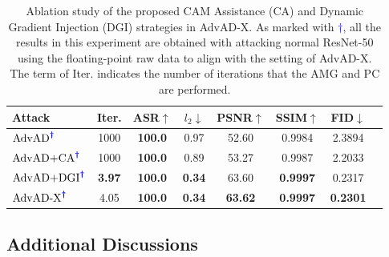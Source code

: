 \documentclass{article}
\begin{document}
\begin{table}[h]
    \caption{Ablation study of the proposed CAM Assistance (CA) and Dynamic Gradient Injection (DGI) strategies in AdvAD-X. As marked with \textcolor{blue}{$\boldsymbol{\dag}$}, all the results in this experiment are obtained with attacking normal ResNet-50 using the floating-point raw data to align with the setting of AdvAD-X. The term of Iter. indicates the number of iterations that the AMG and PC are performed.}
    \vspace{0.2cm}
    \label{tab:tab6}
    \renewcommand{\arraystretch}{0.7}
    \centering
    {
    \setlength{\tabcolsep}{5pt}
    \scriptsize
    \begin{tabular}{lccccccc}
        \toprule
        Attack   & Iter.    & ASR$\uparrow$   & $l_2$$\downarrow$     & PSNR$\uparrow$      & SSIM$\uparrow$      & FID$\downarrow$            \\
        \midrule
        $\text{AdvAD}^{\textcolor{blue}{\boldsymbol{\dag}}}$     & 1000      & \textbf{100.0}     & 0.97      & 52.60     & 0.9984    & 2.3894           \\
        $\text{AdvAD+CA}^{\textcolor{blue}{\boldsymbol{\dag}}}$  & 1000      & \textbf{100.0}     & 0.89      & 53.27     & 0.9987    & 2.2033          \\
        $\text{AdvAD+DGI}^{\textcolor{blue}{\boldsymbol{\dag}}}$ & \textbf{3.97}      & \textbf{100.0}     & \textbf{0.34}      & 63.60     & \textbf{0.9997}    & 0.2317         \\
        $\text{AdvAD-X}^{\textcolor{blue}{\boldsymbol{\dag}}}$   & 4.05      & \textbf{100.0}     & \textbf{0.34}      & \textbf{63.62}     & \textbf{0.9997}    & \textbf{0.2301}         \\
        \bottomrule
    \end{tabular}}
\end{table}


\subsection{Additional Discussions}  \label{app:C4}
\end{document}
